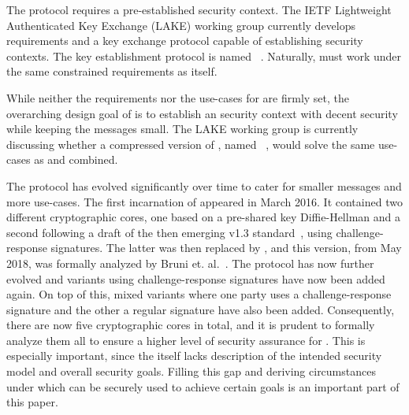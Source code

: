 \documentclass[runningheads]{llncs}
\begin{document}
The \mOscore protocol requires a pre-established security context.
%
The IETF Lightweight Authenticated Key Exchange (LAKE) working group
currently develops requirements and a key exchange protocol capable of
establishing \mOscore security contexts.
%
The key establishment protocol is named \mEdhoc~\cite{selander-lake-edhoc-01}.
%
Naturally, \mEdhoc must work under the same constrained requirements as
\mOscore itself.
%

While neither the requirements nor the use-cases for \mEdhoc are firmly set,
the overarching design goal of \mEdhoc is to establish an \mOscore security
context with decent security while keeping the messages small.
%
The LAKE working group is currently discussing whether a compressed version of
\mTls, named \mCtls~\cite{ietf-tls-ctls-00}, would solve the same use-cases as
\mOscore and \mEdhoc combined.
%

The \mEdhoc protocol has evolved significantly over time to cater for smaller
messages and more use-cases.
%
The first incarnation of \mEdhoc appeared in March 2016.
%
It contained two different cryptographic cores, one based on a
pre-shared key Diffie-Hellman and a second following a draft of the
then emerging \mbox{\mTls v1.3} standard~\cite{ietf-tls-tls13-11}, using
challenge-response signatures.
%
The latter was then replaced by \mSigma, and this version, from May 2018, was
formally analyzed by Bruni et. al.~\cite{DBLP:conf/secsr/BruniJPS18}.
%
The protocol has now further evolved and variants using challenge-response
signatures have now been added again.
%
On top of this, mixed variants where one party uses a challenge-response
signature and the other a regular signature have also been added.
%
Consequently, there are now five cryptographic cores in total, and it is prudent
to formally analyze them all to ensure a higher level of security assurance for
\mEdhoc.
%
This is especially important, since the \mSpec itself lacks description of the
intended security model and overall security goals.
%
Filling this gap and deriving circumstances under which \mEdhoc can be
securely used to achieve certain goals is an important part of this paper.
%

\end{document}
